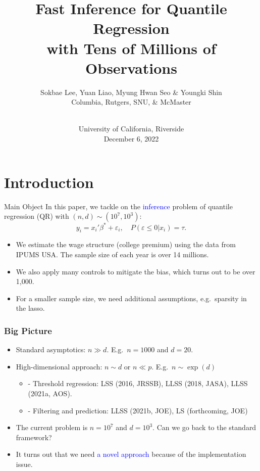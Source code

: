 \documentclass[beamer, t]{beamer}
\newcommand{\bit}{\begin{itemize}}
\newcommand{\eit}{\end{itemize}}
\newcommand{\tcb}{\textcolor{blue}}
\begin{document}
\title{Fast Inference for Quantile Regression \\ 
with Tens of Millions of Observations}
\author[Lee, Liao, Seo \& Shin]{Sokbae Lee, Yuan Liao, Myung Hwan Seo \& Youngki Shin \\
\vskip5pt
\tiny Columbia, Rutgers, SNU, \& McMaster}
\date{\\
University of California, Riverside\\
December 6, 2022}
\maketitle







\section{Introduction}


\begin{frame}{Main Object}
In this paper, we tackle on the \tcb{inference} problem of quantile regression (QR) with $(n,d)\sim(10^7,10^3)$:
		$$
		y_i = x_i'\beta^*+ \varepsilon_i,\quad P(\varepsilon\leq 0|x_i)= \tau.
		$$

	\begin{itemize}

		\item We estimate the wage structure (college premium) using the data from IPUMS USA. The sample size of each year is over 14 millions. 
		
		\item We also apply many controls to mitigate the bias, which turns out to be over 1,000. 
		
		\item For a smaller sample size, we need additional assumptions, e.g.\ sparsity in the lasso. 

		
	\end{itemize}
	
\end{frame}

\begin{frame}
\frametitle{Big Picture}
\bit
	\item Standard asymptotics: $n \gg d$. E.g.~$n=1000$ and $d=20$.
	\item High-dimensional approach: $n \sim d$ or $n \ll p$. E.g.~$n \sim \exp(d)$
	\bit
		\item[-] Threshold regression: LSS (2016, JRSSB), LLSS (2018, JASA), LLSS (2021a, AOS).
		\item[-] Filtering and prediction: LLSS (2021b, JOE), LS (forthcoming, JOE)
	\eit
	\item The current problem is $n=10^7$ and $d=10^3$. Can we go back to the standard framework?

	\item It turns out that we need \tcb{a novel approach} because of the implementation issue.
\eit
\end{frame}
\end{document}
